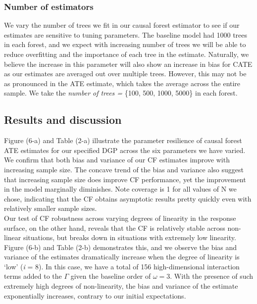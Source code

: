 \documentclass[12pt]{article}
\begin{document}
\subsubsection{Number of estimators} 
We vary the number of trees we fit in our causal forest estimator to see if our
estimates are sensitive to tuning parameters. The baseline model had 1000 trees
in each forest, and we expect with increasing number of trees we will be able to
reduce overfitting and the importance of each tree in the estimate. Naturally,
we believe the increase in this parameter will also show an increase in bias for
CATE as our estimates are averaged out over multiple trees. However, this may
not be as pronounced in the ATE estimate, which takes the average across the
entire sample. We take the \textit{number of trees =} \{100, 500, 1000, 5000\}
in each forest. 


\subsection{Results and discussion} 

Figure (6-a) and Table (2-a) illustrate the parameter resilience of causal forest ATE estimates for our specified DGP across the six parameters we have varied. We confirm that both bias and variance of our CF estimates improve with increasing sample size. The concave trend of the bias and variance also suggest that increasing sample size does improve CF performance, yet the improvement in the model marginally diminishes. Note coverage is 1 for all values of N we chose, indicating that the CF obtains asymptotic results pretty quickly even with relatively smaller sample sizes. \\ 

Our test of CF robustness across varying degrees of linearity in the response surface, on the other hand, reveals that the CF is relatively stable across non-linear situations, but breaks down in situations with extremely low linearity. Figure (6-b) and Table (2-b) demonstrates this, and we observe the bias and variance of the estimates dramatically increase when the degree of linearity is `low' (\textit{i} = 8). In this case, we have a total of 156 high-dimensional interaction terms added to the $\Gamma$ given the baseline order of $\omega = 3$.  With the presence of such extremely high degrees of non-linearity, the bias and variance of the estimate exponentially increases, contrary to our initial expectations. \\ 
\end{document}

